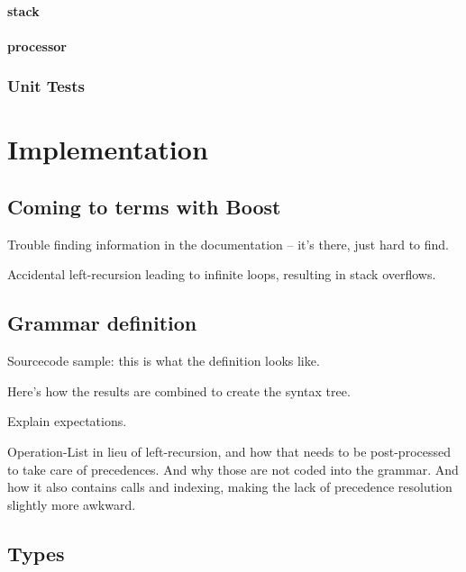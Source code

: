             \subsubsection{stack}
            \subsubsection{processor}
        
        \subsection{Unit Tests}


\chapter{Implementation}

    
    \section{Coming to terms with Boost}
    
        Trouble finding information in the documentation -- it's there, just hard to find.
        
        Accidental left-recursion leading to infinite loops, resulting in stack overflows.
    
    \section{Grammar definition}
    
        Sourcecode sample: this is what the definition looks like.
        
        Here's how the results are combined to create the syntax tree.
        
        Explain expectations.
        
        Operation-List in lieu of left-recursion, and how that needs to be post-processed to take care of precedences. And why those are not coded into the grammar. And how it also contains calls and indexing, making the lack of precedence resolution slightly more awkward.
    
    \section{Types}
        
